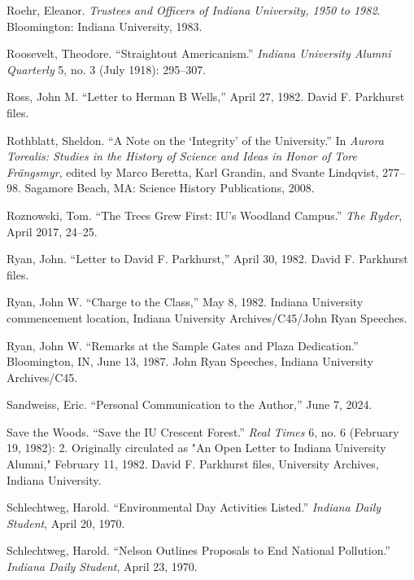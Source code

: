 \documentclass[
  american,
  letterpaper,
]{scrreprt}
\newlength{\cslhangindent}
\newenvironment{CSLReferences}[2] %
 {\begin{list}{}{%
  \setlength{\itemindent}{0pt}
  \setlength{\leftmargin}{0pt}
  \setlength{\parsep}{0pt}
  \ifodd #1
   \setlength{\leftmargin}{\cslhangindent}
   \setlength{\itemindent}{-1\cslhangindent}
  \fi
  \setlength{\itemsep}{#2\baselineskip}}}
 {\end{list}}
\begin{document}
\begin{CSLReferences}{1}{0}
Roehr, Eleanor. \emph{Trustees and Officers of Indiana University, 1950
to 1982}. Bloomington: Indiana University, 1983.

Roosevelt, Theodore. {``Straightout Americanism.''} \emph{Indiana
University Alumni Quarterly} 5, no. 3 (July 1918): 295--307.

Ross, John M. {``Letter to Herman {B} Wells,''} April 27, 1982. David F.
Parkhurst files.

Rothblatt, Sheldon. {``{A Note on the {`Integrity'} of the
University}.''} In \emph{Aurora Torealis: Studies in the History of
Science and Ideas in Honor of Tore Frängsmyr}, edited by Marco Beretta,
Karl Grandin, and Svante Lindqvist, 277--98. Sagamore Beach, MA: Science
History Publications, 2008.

Roznowski, Tom. {``The Trees Grew First: IU's Woodland Campus.''}
\emph{The Ryder}, April 2017, 24--25.

Ryan, John. {``Letter to David {F.} Parkhurst,''} April 30, 1982. David
F. Parkhurst files.

Ryan, John W. {``Charge to the Class,''} May 8, 1982. Indiana University
commencement location, Indiana University Archives/C45/John Ryan
Speeches.

Ryan, John W. {``Remarks at the Sample Gates and Plaza Dedication.''}
Bloomington, IN, June 13, 1987. John Ryan Speeches, Indiana University
Archives/C45.

Sandweiss, Eric. {``Personal Communication to the Author,''} June 7,
2024.

Save the Woods. {``Save the IU Crescent Forest.''} \emph{Real Times} 6,
no. 6 (February 19, 1982): 2. Originally circulated as "An Open Letter
to Indiana University Alumni," February 11, 1982. David F. Parkhurst
files, University Archives, Indiana University.

Schlechtweg, Harold. {``Environmental Day Activities Listed.''}
\emph{Indiana Daily Student}, April 20, 1970.

Schlechtweg, Harold. {``Nelson Outlines Proposals to End National
Pollution.''} \emph{Indiana Daily Student}, April 23, 1970.


\end{CSLReferences}
\end{document}
